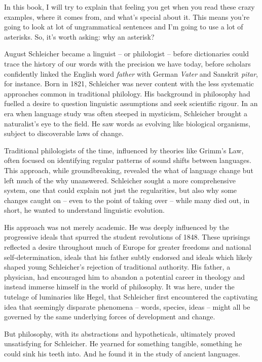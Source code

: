 In this book, I will try to explain that feeling you get when you read these crazy examples, where it comes from, and what's special about it. This means you're going to look at lot of ungrammatical sentences and I'm going to use a lot of asterisks. So, it's worth asking: why an asterisk?

\bigskip

August Schleicher became a linguist -- or philologist -- before dictionaries could trace the history of our words with the precision we have today, before scholars confidently linked the English word \textit{father} with German \textit{Vater} and Sanskrit \textit{pitar}, for instance. Born in 1821, Schleicher was never content with the less systematic approaches common in traditional philology. His background in philosophy had fuelled a desire to question linguistic assumptions and seek scientific rigour. In an era when language study was often steeped in mysticism, Schleicher brought a naturalist's eye to the field. He saw words as evolving like biological organisms, subject to discoverable laws of change.

Traditional philologists of the time, influenced by theories like Grimm's Law, often focused on identifying regular patterns of sound shifts between languages. This approach, while groundbreaking, revealed the what of language change but left much of the why unanswered. Schleicher sought a more comprehensive system, one that could explain not just the regularities, but also why some changes caught on -- even to the point of taking over -- while many died out, in short, he wanted to understand linguistic evolution.

His approach was not merely academic. He was deeply influenced by the progressive ideals that spurred the student revolutions of 1848. These uprisings reflected a desire throughout much of Europe for greater freedoms and national self-determination, ideals that his father subtly endorsed and ideals which likely shaped young Schleicher's rejection of traditional authority. His father, a physician, had encouraged him to abandon a potential career in theology and instead immerse himself in the world of philosophy. It was here, under the tutelage of luminaries like Hegel, that Schleicher first encountered the captivating idea that seemingly disparate phenomena -- words, species, ideas -- might all be governed by the same underlying forces of development and change.

But philosophy, with its abstractions and hypotheticals, ultimately proved unsatisfying for Schleicher. He yearned for something tangible, something he could sink his teeth into. And he found it in the study of ancient languages.


